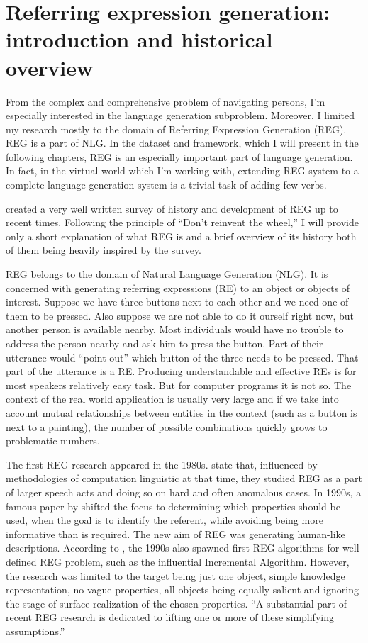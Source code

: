 \section{Referring expression generation: introduction and historical overview}
\label{sec:bg-reg}
From the complex and comprehensive problem of navigating persons, I'm especially interested in the language generation subproblem. Moreover, I limited my research mostly to the domain of Referring Expression Generation (REG). REG is a part of NLG. In the dataset and framework, which I will present in the following chapters, REG is an especially important part of language generation. In fact, in the virtual world which I'm working with, extending REG system to a complete language generation system is a trivial task of adding few verbs.

\citet{krahmer2012computational} created a very well written survey of history and development of REG up to recent times. Following the principle of ``Don't reinvent the wheel,'' I will provide only a short explanation of what REG is and a brief overview of its history both of them being heavily inspired by the survey.

REG belongs to the domain of Natural Language Generation (NLG). It is concerned with generating referring expressions (RE) to an object or objects of interest. Suppose we have three buttons next to each other and we need one of them to be pressed. Also suppose we are not able to do it ourself right now, but another person is available nearby. Most individuals would have no trouble to address the person nearby and ask him to press the button. Part of their utterance would ``point out'' which button of the three needs to be pressed. That part of the utterance is a RE. Producing understandable and effective REs is for most speakers relatively easy task. But for computer programs it is not so. The context of the real world application is usually very large and if we take into account mutual relationships between entities in the context (such as a button is next to a painting), the number of possible combinations quickly grows to problematic numbers. 

The first REG research appeared in the 1980s. \citet{krahmer2012computational} state that, influenced by methodologies of computation linguistic at that time, they studied REG as a part of larger speech acts and doing so on hard and often anomalous cases. In 1990s, a famous paper by \citet{dale1995computational} shifted the focus to determining which properties should be used, when the goal is to identify the referent, while avoiding being more informative than is required. The new aim of REG was generating human-like descriptions.  According to \citet{krahmer2012computational}, the 1990s also spawned first REG algorithms for well defined REG problem, such as the influential Incremental Algorithm. However, the research was limited to the target being just one object, simple knowledge representation, no vague properties, all objects being equally salient and ignoring the stage of surface realization of the chosen properties. ``A substantial part of recent REG research is dedicated to lifting one or more of these simplifying assumptions.'' \citep{krahmer2012computational} 


